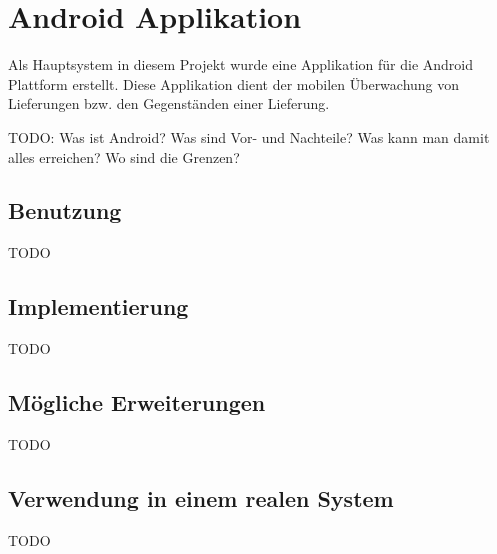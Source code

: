 \section{Android Applikation}
\label{sec:android}

Als Hauptsystem in diesem Projekt wurde eine Applikation für die Android
	Plattform erstellt. Diese Applikation dient der mobilen Überwachung
	von Lieferungen bzw. den Gegenständen einer Lieferung.

TODO: Was ist Android? Was sind Vor- und Nachteile? Was kann man damit alles
	erreichen? Wo sind die Grenzen?
	
\subsection{Benutzung}

TODO	

\subsection{Implementierung}

TODO

\subsection{Mögliche Erweiterungen}

TODO

\subsection{Verwendung in einem realen System}

TODO